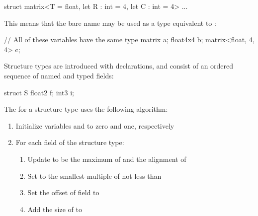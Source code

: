 \begin{codeblock}
struct matrix<T = float, let R : int = 4, let C : int = 4> { ... }
\end{codeblock}

This means that the bare name  may be used as a type equivalent to :

\begin{codeblock}
// All of these variables have the same type
matrix a;
float4x4 b;
matrix<float, 4, 4> c;
\end{codeblock}


Structure types are introduced with  declarations, and consist of an ordered sequence of named and typed fields:

\begin{codeblock}
struct S
{
    float2 f;
    int3 i;
}
\end{codeblock}


The  for a structure type uses the following algorithm:

\begin{enumerate}
  \item{Initialize variables  and  to zero and one, respectively}
  \item{For each field  of the structure type:}
  \begin{enumerate}
    \item {Update  to be the maximum of  and the alignment of }
    \item {Set  to the smallest multiple of  not less than }
    \item {Set the offset of field  to }
    \item {Add the size of  to }
  \end{enumerate}
\end{enumerate}

